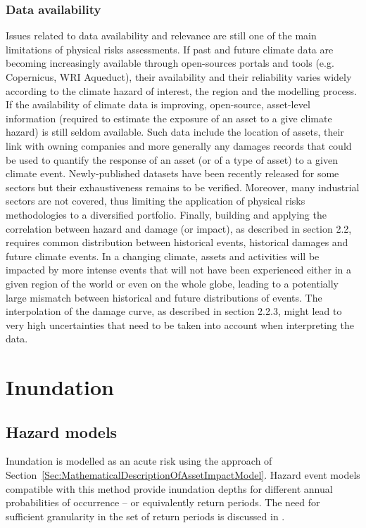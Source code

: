 \documentclass[a4paper,11pt]{extarticle} %
\begin{document}
\subsubsection{Data availability}
Issues related to data availability and relevance are still one of the main limitations of physical risks assessments. If past and future climate data are becoming increasingly available through open-sources portals and tools (e.g. Copernicus, WRI Aqueduct), their availability and their reliability varies widely according to the climate hazard of interest, the region and the modelling process. If the availability of climate data is improving, open-source, asset-level information (required to estimate the exposure of an asset to a give climate hazard) is still seldom available. Such data include the location of assets, their link with owning companies and more generally any damages records that could be used to quantify the response of an asset (or of a type of asset) to a given climate event. Newly-published datasets have been recently released for some sectors but their exhaustiveness remains to be verified. Moreover, many industrial sectors are not covered, thus limiting the application of physical risks methodologies to a diversified portfolio.
Finally, building and applying the correlation between hazard and damage (or impact), as described in section 2.2, requires common distribution between historical events, historical damages and future climate events. In a changing climate, assets and activities will be impacted by more intense events that will not have been experienced either in a given region of the world or even on the
whole globe, leading to a potentially large mismatch between historical and future distributions of events. The interpolation of the damage curve, as described in section 2.2.3, might lead to very high uncertainties that need to be taken into account when interpreting the data.




\section{Inundation}
\subsection{Hazard models}
Inundation is modelled as an acute risk using the approach of Section~\ref{Sec:MathematicalDescriptionOfAssetImpactModel}. Hazard event models compatible with this method provide inundation depths for different annual probabilities of occurrence -- or equivalently return periods. The need for sufficient granularity in the set of return periods is discussed in \cite{WardEtAl:2011}.
\end{document}
